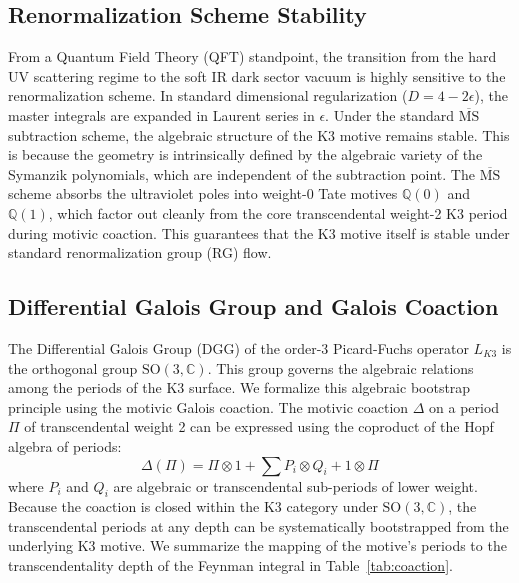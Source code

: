 \documentclass[11pt,a4paper]{article}
\begin{document}
\subsection{Renormalization Scheme Stability}
From a Quantum Field Theory (QFT) standpoint, the transition from the hard UV scattering regime to the soft IR dark sector vacuum is highly sensitive to the renormalization scheme. In standard dimensional regularization ($D = 4 - 2\epsilon$), the master integrals are expanded in Laurent series in $\epsilon$. 
Under the standard $\overline{\text{MS}}$ subtraction scheme, the algebraic structure of the K3 motive remains stable. This is because the geometry is intrinsically defined by the algebraic variety of the Symanzik polynomials, which are independent of the subtraction point. The $\overline{\text{MS}}$ scheme absorbs the ultraviolet poles into weight-0 Tate motives $\mathbb{Q}(0)$ and $\mathbb{Q}(1)$, which factor out cleanly from the core transcendental weight-2 K3 period during motivic coaction. This guarantees that the K3 motive itself is stable under standard renormalization group (RG) flow.

\subsection{Differential Galois Group and Galois Coaction}
The Differential Galois Group (DGG) of the order-3 Picard-Fuchs operator $L_{K3}$ is the orthogonal group $\text{SO}(3, \mathbb{C})$. This group governs the algebraic relations among the periods of the K3 surface. We formalize this algebraic bootstrap principle using the motivic Galois coaction. 
The motivic coaction $\Delta$ on a period $\Pi$ of transcendental weight 2 can be expressed using the coproduct of the Hopf algebra of periods:
\begin{equation}
\Delta(\Pi) = \Pi \otimes 1 + \sum P_i \otimes Q_i + 1 \otimes \Pi
\end{equation}
where $P_i$ and $Q_i$ are algebraic or transcendental sub-periods of lower weight. Because the coaction is closed within the K3 category under $\text{SO}(3,\mathbb{C})$, the transcendental periods at any depth can be systematically bootstrapped from the underlying K3 motive. We summarize the mapping of the motive's periods to the transcendentality depth of the Feynman integral in Table~\ref{tab:coaction}.
\end{document}
